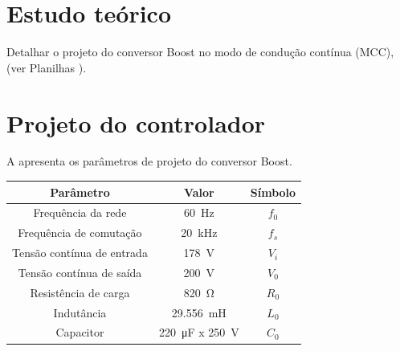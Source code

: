 \section{Estudo teórico}

Detalhar o projeto do conversor Boost \cite{inep-cccc-2006} no modo de condução contínua (MCC), (ver Planilhas \cite{noauthor_ptc_nodate}).

%
%
%



\section{Projeto do controlador}

A  apresenta os parâmetros de projeto do conversor Boost.

\begin{center}
	\label{tab:parametrosBoost}
	\begin{tabular}{@{}ccc@{}}
		\toprule
		\textbf{Parâmetro} & \textbf{Valor} & \textbf{Símbolo} \\ \midrule			
		Frequência  da rede        & \SI{60}{\hertz}     & $f_0$  \\		
		Frequência de comutação        & \SI{20}{\kilo\hertz}     & $f_s$  \\	
		Tensão contínua de entrada         &  \SI{178}{\V}      & $V_i$  \\
		Tensão contínua de saída         &  \SI{200}{\V}      & $V_0$  \\
		Resistência de carga        & \SI{820}{\ohm}      & $R_0$  \\
			Indutância        & \SI{29.556}{\milli\henry}     & $L_0$  \\
			Capacitor           & \SI{220}{\micro\farad} x \SI{250}{\V}      & $C_0$               \\
		 \bottomrule	
	\end{tabular}
\end{center}




